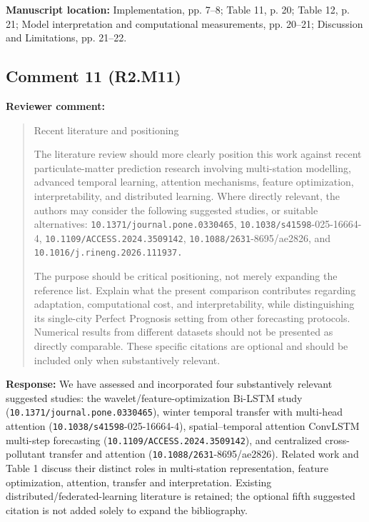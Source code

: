 \documentclass[11pt,a4paper]{article}
\begin{document}
\textbf{Manuscript location:} Implementation, pp. 7--8; Table 11, p. 20; Table 12, p. 21; Model interpretation and computational measurements, pp. 20--21; Discussion and Limitations, pp. 21--22.
\begin{samepage}
\subsection*{Comment 11 (R2.M11)}
\textbf{Reviewer comment:}
\begin{quote}\small Recent literature and positioning

The literature review should more clearly position this work against recent particulate-matter prediction research involving multi-station modelling, advanced temporal learning, attention mechanisms, feature optimization, interpretability, and distributed learning. Where directly relevant, the authors may consider the following suggested studies, or suitable alternatives: \nolinkurl{10.1371/journal.pone.0330465}, \nolinkurl{10.1038/s41598}-025-16664-4, \nolinkurl{10.1109/ACCESS.2024.3509142}, \nolinkurl{10.1088/2631}-8695/ae2826, and \nolinkurl{10.1016/j.rineng.2026.111937.}

The purpose should be critical positioning, not merely expanding the reference list. Explain what the present comparison contributes regarding adaptation, computational cost, and interpretability, while distinguishing its single-city Perfect Prognosis setting from other forecasting protocols. Numerical results from different datasets should not be presented as directly comparable. These specific citations are optional and should be included only when substantively relevant.\end{quote}
\end{samepage}
\textbf{Response:}
We have assessed and incorporated four substantively relevant suggested studies: the wavelet/feature-optimization Bi-LSTM study (\nolinkurl{10.1371/journal.pone.0330465}), winter temporal transfer with multi-head attention (\nolinkurl{10.1038/s41598}-025-16664-4), spatial--temporal attention ConvLSTM multi-step forecasting (\nolinkurl{10.1109/ACCESS.2024.3509142}), and centralized cross-pollutant transfer and attention (\nolinkurl{10.1088/2631}-8695/ae2826). Related work and Table 1 discuss their distinct roles in multi-station representation, feature optimization, attention, transfer and interpretation. Existing distributed/federated-learning literature is retained; the optional fifth suggested citation is not added solely to expand the bibliography.
\end{document}
